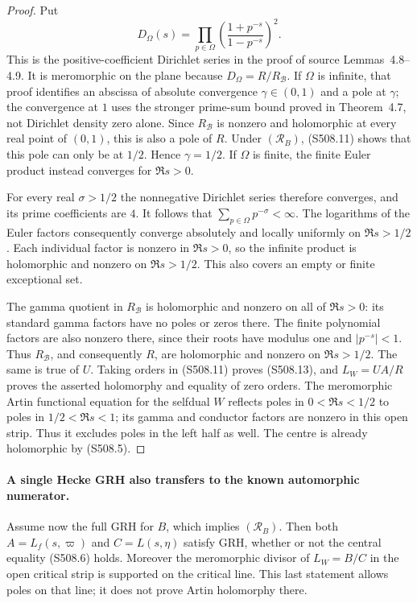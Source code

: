 \begin{proof}
Put
\[
 D_\Omega(s)=\prod_{p\in\Omega}
             \left(\frac{1+p^{-s}}{1-p^{-s}}\right)^2.
\]
This is the positive-coefficient Dirichlet series in the proof
of source Lemmas~4.8--4.9.  It is meromorphic on the plane
because $D_\Omega=R/R_{\mathcal B}$.  If $\Omega$ is infinite,
that proof identifies an abscissa of absolute convergence
$\gamma\in(0,1)$ and a pole at $\gamma$; the convergence at $1$
uses the stronger prime-sum bound proved in Theorem~4.7, not
Dirichlet density zero alone.  Since $R_{\mathcal B}$ is nonzero
and holomorphic at every real point of $(0,1)$, this is also a
pole of $R$.  Under $(\mathcal R_B)$, (S508.11) shows that this
pole can only be at $1/2$.  Hence $\gamma=1/2$.
If $\Omega$ is finite, the finite Euler product instead
converges for $\Re s>0$.

For every real $\sigma>1/2$ the nonnegative Dirichlet series
therefore converges, and its prime coefficients are $4$.
It follows that $\sum_{p\in\Omega}p^{-\sigma}<\infty$.
The logarithms of the Euler factors consequently converge
absolutely and locally uniformly on $\Re s>1/2$.
Each individual factor is nonzero in $\Re s>0$, so the
infinite product is holomorphic and nonzero on $\Re s>1/2$.
This also covers an empty or finite exceptional set.

The gamma quotient in $R_{\mathcal B}$ is holomorphic and
nonzero on all of $\Re s>0$: its standard gamma factors have
no poles or zeros there.  The finite polynomial factors are
also nonzero there, since their roots have modulus one and
$|p^{-s}|<1$.  Thus $R_{\mathcal B}$, and consequently $R$,
are holomorphic and nonzero on $\Re s>1/2$.
The same is true of $U$.  Taking orders in (S508.11) proves
(S508.13), and $L_W=UA/R$ proves the asserted holomorphy
and equality of zero orders.  The meromorphic Artin functional
equation for the selfdual $W$ reflects poles in
$0<\Re s<1/2$ to poles in $1/2<\Re s<1$;
its gamma and conductor factors are nonzero in this open strip.
Thus it excludes poles in the left half as well.  The centre
is already holomorphic by (S508.5).
\end{proof}

\paragraph{A single Hecke GRH also transfers to the known automorphic numerator.}
Assume now the full GRH for $B$, which implies
$(\mathcal R_B)$.  Then both $A=L_f(s,\varpi)$ and $C=L(s,\eta)$
satisfy GRH, whether or not the central equality (S508.6) holds.
Moreover the meromorphic divisor of $L_W=B/C$ in the open
critical strip is supported on the critical line.  This last
statement allows poles on that line; it does not prove Artin
holomorphy there.

